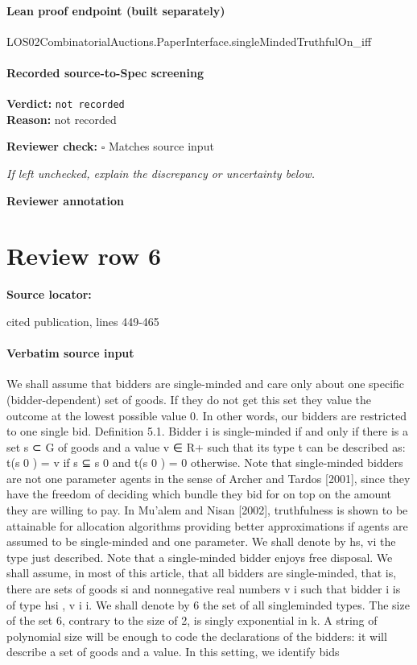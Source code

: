 \documentclass[10pt]{article}
\newcommand{\reviewerbox}{%
  \par\noindent\fbox{\parbox{0.96\linewidth}{\rule{0pt}{0.38in}}}\par
}
\newcommand{\reviewmatch}[1]{%
  \par\noindent\textbf{Reviewer check:} $\square$\; #1\par
  \noindent\emph{If left unchecked, explain the discrepancy or uncertainty below.}\par
}
\begin{document}
\paragraph{Lean proof endpoint (built separately)}\begin{ReviewVerbatim}
LOS02CombinatorialAuctions.PaperInterface.singleMindedTruthfulOn_iff
\end{ReviewVerbatim}

\paragraph{Recorded source-to-Spec screening}
\textbf{Verdict:} \texttt{not recorded}
\\
\textbf{Reason:} not recorded
\reviewmatch{Matches source input}
\noindent\textbf{Reviewer annotation}\par
\reviewerbox
\clearpage
\hypertarget{source-claim-790fa5df2624ee60}{}
\section*{Review row 6}
\textbf{Source locator:} {\footnotesize\raggedright cited publication, lines 449-\allowbreak{}465\par}
\paragraph{Verbatim source input}
\begin{ReviewVerbatim}
We shall assume that bidders are single-minded and care only about one specific
(bidder-dependent) set of goods. If they do not get this set they value the outcome
at the lowest possible value 0. In other words, our bidders are restricted to one
single bid.
Definition 5.1. Bidder i is single-minded if and only if there is a set s ⊂ G of
goods and a value v ∈ R+ such that its type t can be described as: t(s 0 ) = v if s ⊆ s 0
and t(s 0 ) = 0 otherwise.
Note that single-minded bidders are not one parameter agents in the sense
of Archer and Tardos [2001], since they have the freedom of deciding which bundle
they bid for on top on the amount they are willing to pay. In Mu’alem and Nisan
[2002], truthfulness is shown to be attainable for allocation algorithms providing
better approximations if agents are assumed to be single-minded and one parameter. We shall denote by hs, vi the type just described. Note that a single-minded
bidder enjoys free disposal. We shall assume, in most of this article, that all bidders
are single-minded, that is, there are sets of goods si and nonnegative real numbers
v i such that bidder i is of type hsi , v i i. We shall denote by 6 the set of all singleminded types. The size of the set 6, contrary to the size of 2, is singly exponential
in k. A string of polynomial size will be enough to code the declarations of the
bidders: it will describe a set of goods and a value. In this setting, we identify bids
\end{ReviewVerbatim}
\end{document}
